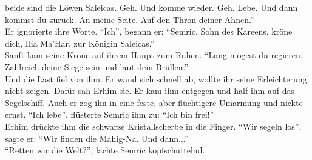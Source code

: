 beide sind die Löwen Saleicas. Geh. Und komme wieder. Geh. Lebe. Und dann kommst du zurück. An 
meine Seite. Auf den Thron deiner Ahnen.''\\
Er ignorierte ihre Worte. ``Ich'', begann er: ``Semric, Sohn des Kareens, kröne dich, Ilia Ma'Har, 
zur Königin Saleicas.''\\
Sanft kam seine Krone auf ihrem Haupt zum Ruhen. ``Lang mögest du regieren. Zahlreich deine Siege 
sein und laut dein Brüllen.''\\
Und die Last fiel von ihm. Er wand sich schnell ab, wollte ihr seine Erleichterung nicht zeigen. 
Dafür sah Erhim sie. Er kam ihm entgegen und half ihm auf das Segelschiff. Auch er zog ihn in eine 
feste, aber flüchtigere Umarmung und nickte ernst. ``Ich lebe'', flüsterte Semric ihm zu: ``Ich bin 
frei!''\\
Erhim drückte ihm die schwarze Kristallscherbe in die Finger. ``Wir segeln los'', sagte er: ``Wir 
finden die Mahig-Na. Und dann...''\\
``Retten wir die Welt?'', lachte Semric kopfschüttelnd.
